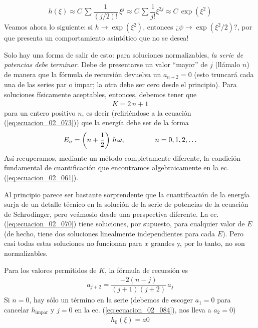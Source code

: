 \begin{align*}
h (\xi) \approx C \, \sum \dfrac{1}{(j/2)!} \, \xi^{j} \approx C \, \sum \dfrac{1}{j!} \xi^{2 j} \approx C \, \exp \left( \xi^{2} \right)
\end{align*}
Veamos ahora lo siguiente: si $h \to \exp \left( \xi^{2} \right)$, entonces ¿$\psi \to \exp \left( \xi^{2}/2 \right)$?, por que presenta un comportamiento asintótico que no se desea!
\par
Solo hay una forma de salir de esto: para soluciones normalizables, \textit{la serie de potencias debe terminar}. Debe de presentarse un valor \enquote{mayor} de $j$ (llámalo $n$) de manera que la fórmula de recursión devuelva un $a_{n+2} = 0$ (esto truncará cada una de las series par o impar; la otra debe ser cero desde el principio). Para soluciones físicamente aceptables, entonces, debemos tener que
\begin{align*}
K = 2 \, n + 1
\end{align*}
para un entero positivo $n$, es decir (refiriéndose a la ecuación (\ref{eq:ecuacion_02_073})) que la energía debe ser de la forma
\begin{align}
E_{n} = \left( n + \dfrac{1}{2} \right) \, \hbar \, \omega , \hspace{1.5cm} n = 0, 1, 2, \ldots
\label{eq:ecuacion_02_083}
\end{align}
Así recuperamos, mediante un método completamente diferente, la condición fundamental de cuantificación que encontramos algebraicamente en la ec. (\ref{eq:ecuacion_02_061}).
\par
Al principio parece ser bastante sorprendente que la cuantificación de la energía surja de un detalle técnico en la solución de la serie de potencias de la ecuación de Schrodinger, pero veámoslo desde una perspectiva diferente. La ec. (\ref{eq:ecuacion_02_070}) tiene soluciones, por supuesto, para cualquier valor de $E$ (de hecho, tiene dos soluciones linealmente independientes para cada $E$). Pero casi todas estas soluciones no funcionan para $x$ grandes y, por lo tanto, no son normalizables.
\par
Para los valores permitidos de $K$, la fórmula de recursión es
\begin{align}
a_{j+2} = \dfrac{- 2 (n - j)}{(j + 1)(j + 2)} \, a_{j}
\label{eq:ecuacion_02_084}
\end{align}
Si $n = 0$, hay sólo un término en la serie (debemos de escoger $a_{1} = 0$ para cancelar $h_{\text{impar}}$ y $j=0$ en la ec. (\ref{eq:ecuacion_02_084}), nos lleva a $a_{2}=0$)
\begin{align*}
h_{0} (\xi) = a{0}
\end{align*}
